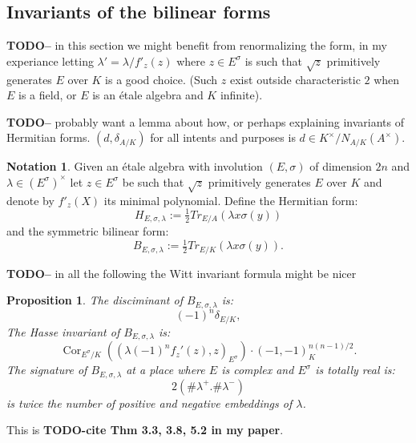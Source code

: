 \documentclass{article}
\theoremstyle{plain}
\newtheorem{proposition}[theorem]{Proposition}
\theoremstyle{definition}
\newtheorem{notation}[theorem]{Notation}
\numberwithin{equation}{section}
\DeclareMathOperator{\Cor}{Cor}
\newcommand{\TODO}[1]{\textbf{TODO-#1}}
\begin{document}
\subsection{Invariants of the bilinear forms}

\TODO - in this section we might benefit from renormalizing the form, in my experiance letting $\lambda' = \lambda/f'_z(z)$ where $z\in E^\sigma$ is such that $\sqrt{z}$ primitively generates $E$ over $K$ is a good choice.
(Such $z$ exist outside characteristic $2$ when $E$ is a field, or $E$ is an \'etale algebra and $K$ infinite).

\TODO - probably want a lemma about how, or perhaps explaining invariants of Hermitian forms.
$(d,\delta_{A/K}) $ for all intents and purposes is $d \in K^\times/N_{A/K}(A^\times)$.

\begin{notation}
Given an \'etale algebra with involution $(E,\sigma)$ of dimension $2n$ and $\lambda \in (E^\sigma)^\times$ let $z\in E^\sigma$ be such that $\sqrt{z}$ primitively generates $E$ over $K$ and denote by $f'_z(X)$ its minimal polynomial.
Define the Hermitian form:
\[ H_{E,\sigma,\lambda} := \tfrac{1}{2}Tr_{E/A}\left(\lambda x\sigma(y)\right) \]
and the symmetric bilinear form:
\[ B_{E,\sigma,\lambda} := \tfrac{1}{2}Tr_{E/K}\left(\lambda x\sigma(y)\right). \]
\end{notation}

\TODO - in all the following the Witt invariant formula might be nicer

\begin{proposition}\label{prop:Hasse}
The disciminant of $B_{E,\sigma,\lambda}$ is:
\[  (-1)^n\delta_{E/K}, \]
The Hasse invariant of $B_{E,\sigma,\lambda}$ is:
\[  \Cor_{E^\sigma/K}((\lambda (-1)^n f_z'(z), z)_{E^\sigma})\cdot(-1,-1)_K^{n(n-1)/2}.\] 
The signature of $B_{E,\sigma,\lambda}$ at a place where $E$ is complex and $E^\sigma$ is totally real is:
\[ 2(\#\lambda^+. \#\lambda^-) \]
is twice the number of positive and negative embeddings of $\lambda$.
\end{proposition}
This is \TODO{cite Thm 3.3, 3.8, 5.2 in my paper}.
\end{document}
